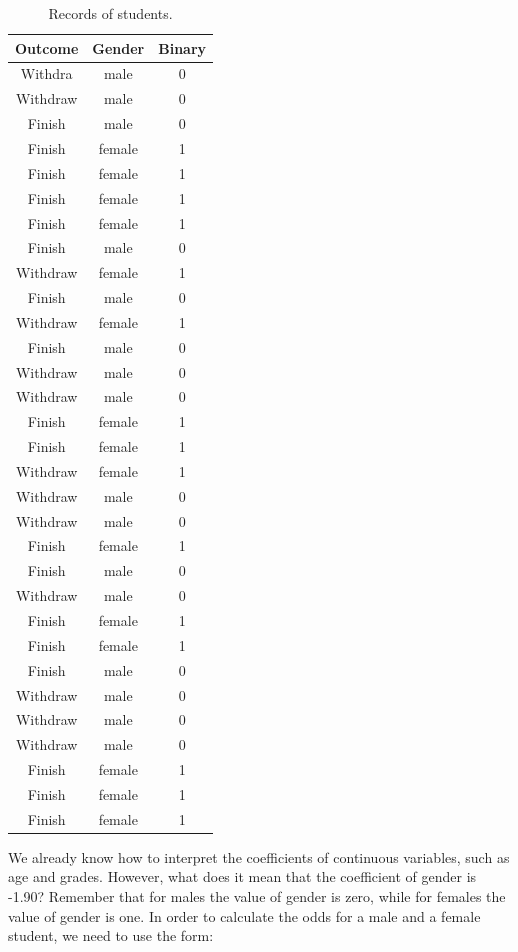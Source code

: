 \documentclass[a4paper,12pt,oneside]{book}
\begin{document}
\begin{longtable}[c]{ c c c}
	\caption{Records of students.\label{table:binary}}\\
		\hline
		\bf Outcome & \bf Gender & \bf Binary \\
		\hline
		Withdra & male & 0 \\
		Withdraw & male & 0 \\
		Finish & male & 0 \\
		Finish & female & 1 \\
		Finish & female & 1 \\
		Finish & female & 1 \\
		Finish & female & 1 \\
		Finish & male & 0 \\
		Withdraw & female & 1 \\
		Finish & male & 0 \\
		Withdraw & female & 1 \\
		Finish & male & 0 \\
		Withdraw & male & 0 \\
		Withdraw & male & 0 \\
		Finish & female & 1 \\
		Finish & female & 1 \\
		Withdraw & female & 1 \\
		Withdraw & male & 0 \\
		Withdraw & male & 0 \\
		Finish & female & 1 \\
		Finish & male & 0 \\
		Withdraw & male & 0 \\
		Finish & female & 1 \\
		Finish & female & 1 \\
		Finish & male & 0 \\
		Withdraw & male & 0 \\
		Withdraw & male & 0 \\
		Withdraw & male & 0 \\
		Finish & female & 1 \\
		Finish & female & 1 \\
		Finish & female & 1 \\
	\hline
\end{longtable}
We already know how to interpret the coefficients of continuous variables, such as age and grades. However, what does it mean that the coefficient of gender is -1.90? Remember 
that for males the value of gender is zero, while for females the value of gender is one. In order to calculate the odds for a male and a female student, we need to use the form:
\end{document}
